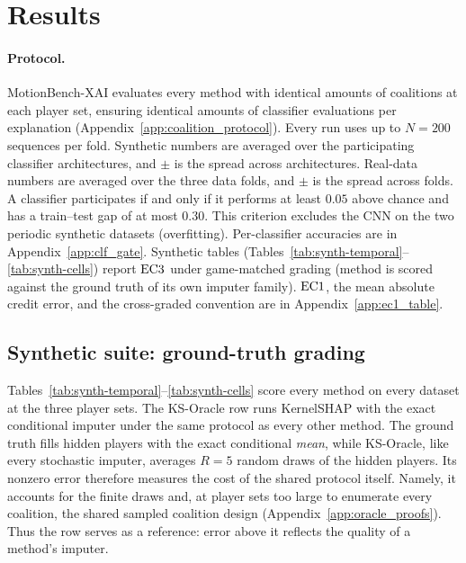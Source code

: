 \section{Results}
\label{sec:results}
\label{sec:salient}

\paragraph{Protocol.} MotionBench-XAI evaluates every method with identical amounts of coalitions at each player set, ensuring identical amounts of classifier evaluations per explanation (Appendix~\ref{app:coalition_protocol}). Every run uses up to $N{=}200$ sequences per fold. Synthetic numbers are averaged over the participating classifier architectures, and $\pm$ is the spread across architectures. Real-data numbers are averaged over the three data folds, and $\pm$ is the spread across folds. A classifier participates if and only if it performs at least $0.05$ above chance and has a train--test gap of at most $0.30$. This criterion excludes the CNN on the two periodic synthetic datasets (overfitting). Per-classifier accuracies are in Appendix~\ref{app:clf_gate}. Synthetic tables
(Tables~\ref{tab:synth-temporal}--\ref{tab:synth-cells}) report $\mathrm{EC3}$ under game-matched grading (method is scored against the ground truth of its own imputer family). $\mathrm{EC1}$, the mean absolute credit error, and the cross-graded convention are in Appendix~\ref{app:ec1_table}.


\subsection{Synthetic suite: ground-truth grading}
\label{sec:results-synth}

Tables~\ref{tab:synth-temporal}--\ref{tab:synth-cells} score every method on every dataset at the three player sets. The KS-Oracle row runs KernelSHAP with the exact conditional imputer under the same protocol as every other method. The ground truth fills hidden players with the exact conditional \emph{mean}, while KS-Oracle, like every stochastic imputer, averages $R{=}5$ random draws of the hidden players. Its nonzero error therefore measures the cost of the shared protocol itself. Namely, it accounts for the finite draws and, at player sets too large to enumerate every coalition, the shared sampled coalition design (Appendix~\ref{app:oracle_proofs}). Thus the row serves as a reference: error above it reflects the quality of a method's imputer.

